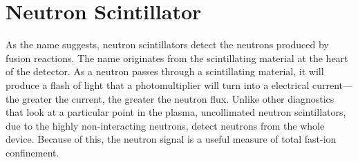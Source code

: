 \section{Neutron Scintillator}
As the name suggests, neutron scintillators detect the neutrons produced by fusion reactions. The name originates from the scintillating material at the heart of the detector. As a neutron passes through a scintillating material, it will produce a flash of light that a photomultiplier will turn into a electrical current---the greater the current, the greater the neutron flux. Unlike other diagnostics that look at a particular point in the plasma, uncollimated neutron scintillators, due to the highly non-interacting neutrons, detect neutrons from the whole device. Because of this, the neutron signal is a useful measure of total fast-ion confinement.

